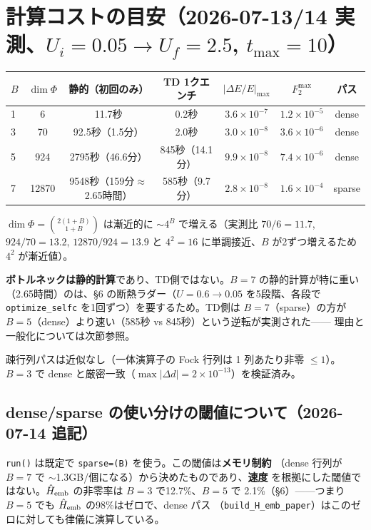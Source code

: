 \documentclass[11pt]{ltjsarticle}
\newcommand{\code}[1]{\texttt{#1}}
\begin{document}
\section{計算コストの目安（2026-07-13/14 実測、$U_i=0.05\to U_f=2.5$, $t_{\max}=10$）}

\begin{center}
\begin{tabular}{lcccccc}
\toprule
$B$ & $\dim\Phi$ & 静的（初回のみ） & TD 1クエンチ & $|\Delta E/E|_{\max}$ & $F_2^{\max}$ & パス \\
\midrule
1 & 6     & 11.7秒            & 0.2秒   & $3.6\times10^{-7}$ & $1.2\times10^{-5}$ & dense \\
3 & 70    & 92.5秒（1.5分）   & 2.0秒   & $3.0\times10^{-8}$ & $3.6\times10^{-6}$ & dense \\
5 & 924   & 2795秒（46.6分）  & 845秒（14.1分） & $9.9\times10^{-8}$ & $7.4\times10^{-6}$ & dense \\
7 & 12870 & 9548秒（159分$\approx$2.65時間） & 585秒（9.7分） & $2.8\times10^{-8}$ & $1.6\times10^{-4}$ & sparse \\
\bottomrule
\end{tabular}
\end{center}

$\dim\Phi=\binom{2(1+B)}{1+B}$ は漸近的に $\sim4^B$ で増える（実測比 $70/6{=}11.7$,
$924/70{=}13.2$, $12870/924{=}13.9$ と $4^2{=}16$ に単調接近、$B$ が2ずつ増えるため
$4^2$ が漸近値）。

\textbf{ボトルネックは静的計算}であり、TD側ではない。$B=7$ の静的計算が特に重い
（2.65時間）のは、\S6 の断熱ラダー（$U=0.6\to0.05$ を5段階、各段で
\code{optimize\_selfc} を1回ずつ）を要するため。TD側は $B=7$（sparse）の方が
$B=5$（dense）より速い（585秒 vs 845秒）という逆転が実測された——
理由と一般化については次節参照。

疎行列パスは近似なし（一体演算子の Fock 行列は 1 列あたり非零 $\le 1$）。
$B=3$ で dense と厳密一致（$\max|\Delta d|=2\times10^{-13}$）を検証済み。

\subsection*{dense/sparse の使い分けの閾値について（2026-07-14 追記）}

\code{run()} は既定で \code{sparse=(B)} を使う。この閾値は\textbf{メモリ制約}
（dense 行列が $B=7$ で $\sim$1.3GB/個になる）から決めたものであり、\textbf{速度}
を根拠にした閾値ではない。$\hat H_{\rm emb}$ の非零率は $B=3$ で12.7\%、$B=5$ で
2.1\%（\S6）——つまり $B=5$ でも $\hat H_{\rm emb}$ の98\%はゼロで、dense パス
（\code{build\_H\_emb\_paper}）はこのゼロに対しても律儀に演算している。
\end{document}
